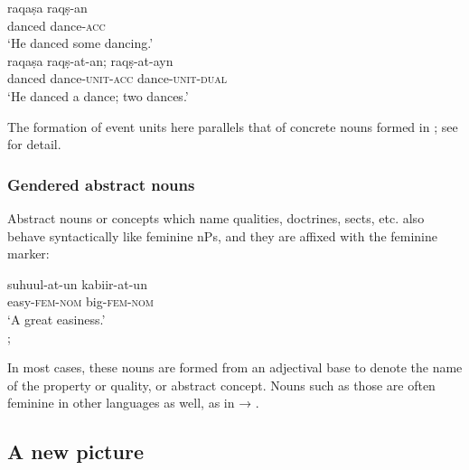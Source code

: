 \begin{exe}
  \ex\label{ex:fassi:11}
  \begin{xlist}
    \ex\label{ex:fassi:11a}
    \gll raqa\d{s}a raq\d{s}-an\\
    danced dance-\textsc{acc}\\
    \glt `He danced some dancing.'\\
    \ex\label{ex:fassi:11b}
    \gll raqa\d{s}a raq\d{s}-at-an; raq\d{s}-at-ayn\\
    danced dance-\textsc{unit-acc} dance-\textsc{unit-dual}\\
    \glt `He danced a dance; two dances.'\\
  \end{xlist}
\end{exe}

The formation of event units here parallels that of concrete nouns formed in
; see \textcite{FassiFehri2005,FassiFehri2012} for detail.

\subsubsection{Gendered abstract nouns}

Abstract nouns or concepts which name qualities, doctrines, sects, etc. also
behave syntactically like feminine nPs, and they are affixed with the feminine
marker:

\begin{exe}
  \ex\label{ex:fassi:12}
  \begin{xlist}
    \ex\label{ex:fassi:12a}
    \gll suhuul-at-un kabiir-at-un\\
    easy-\textsc{fem-nom} big-\textsc{fem-nom}\\
    \glt `A great easiness.'\\
    \ex\label{ex:fassi:12b} ; 
  \end{xlist}
\end{exe}

In most cases, these nouns are formed from an adjectival base to denote the
name of the property or quality, or abstract concept. Nouns such as those are
often feminine in other languages as well, as in   → .

\subsection{A new picture}

